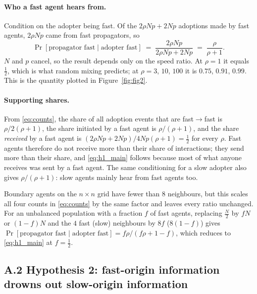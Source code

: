 \paragraph{Who a fast agent hears from.} Condition on the adopter being fast. Of the $2\rho Np + 2Np$ adoptions made by fast agents, $2\rho Np$ came from fast propagators, so
\begin{equation}
\Pr[\text{propagator fast} \mid \text{adopter fast}] \;=\; \frac{2\rho N p}{2\rho N p + 2 N p} \;=\; \frac{\rho}{\rho+1}.
\label{eq:h1_main}
\end{equation}
$N$ and $p$ cancel, so the result depends only on the speed ratio. At $\rho = 1$ it equals $\tfrac12$, which is what random mixing predicts; at $\rho = 3$, $10$, $100$ it is $0.75$, $0.91$, $0.99$. This is the quantity plotted in Figure~\ref{fig:fig2}.

\paragraph{Supporting shares.} From \eqref{eq:counts}, the share of all adoption events that are fast$\to$fast is $\rho/2(\rho+1)$, the share initiated by a fast agent is $\rho/(\rho+1)$, and the share \emph{received} by a fast agent is $(2\rho Np + 2Np)/4Np(\rho+1) = \tfrac12$ for every $\rho$. Fast agents therefore do not receive more than their share of interactions; they send more than their share, and \eqref{eq:h1_main} follows because most of what anyone receives was sent by a fast agent. The same conditioning for a slow adopter also gives $\rho/(\rho+1)$: slow agents mainly hear from fast agents too.

\begin{remark}
Boundary agents on the $n \times n$ grid have fewer than $8$ neighbours, but this scales all four counts in \eqref{eq:counts} by the same factor and leaves every ratio unchanged. For an unbalanced population with a fraction $f$ of fast agents, replacing $\tfrac{N}{2}$ by $fN$ or $(1-f)N$ and the $4$ fast (slow) neighbours by $8f$ ($8(1-f)$) gives $\Pr[\text{propagator fast} \mid \text{adopter fast}] = f\rho/(f\rho + 1 - f)$, which reduces to \eqref{eq:h1_main} at $f = \tfrac12$.
\end{remark}

\subsection*{A.2 \quad Hypothesis 2: fast-origin information drowns out slow-origin information}

